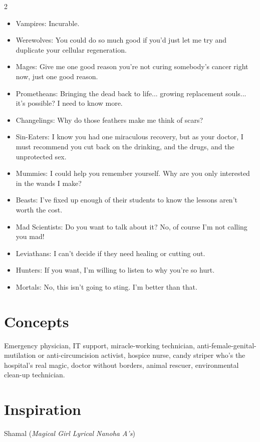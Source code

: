 \begin{multicols}{2}
\begin{itemize}
\item Vampires: Incurable. 
\item Werewolves: You could do so much good if you'd just let me try and duplicate your cellular regeneration. 
\item Mages: Give me one good reason you're not curing somebody's cancer right now, just one good reason. 
\item Prometheans: Bringing the dead back to life... growing replacement souls... it's possible? I need to know more. 
\item Changelings: Why do those feathers make me think of scars?
\item Sin-Eaters: I know you had one miraculous recovery, but as your doctor, I must recommend you cut back on the drinking, and the drugs, and the unprotected sex.
\item Mummies: I could help you remember yourself. Why are you only interested in the wands I make? 
\item Beasts: I've fixed up enough of their students to know the lessons aren't worth the cost.

\item Mad Scientists: Do you want to talk about it? No, of course I'm not calling you mad!
\item Leviathans: I can't decide if they need healing or cutting out.

\item Hunters: If you want, I'm willing to listen to why you're so hurt.
\item Mortals: No, this isn't going to sting. I'm better than that. 
\end{itemize}

\section*{Concepts}
Emergency physician, IT support, miracle-working technician, anti-female-genital-mutilation or anti-circumcision activist, hospice nurse, candy striper who's the hospital's real magic, doctor without borders, animal rescuer, environmental clean-up technician. 

\section*{Inspiration}

Shamal (\textit{Magical Girl Lyrical Nanoha A's})

\end{multicols}\newpage{}
